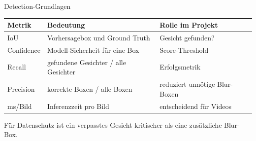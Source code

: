 \begin{frame}{Detection-Grundlagen}
\small
\begin{tabularx}{\textwidth}{l X X}
\toprule
Metrik & Bedeutung & Rolle im Projekt \\
\midrule
IoU & Vorhersagebox und Ground Truth & Gesicht gefunden? \\
Confidence & Modell-Sicherheit für eine Box & Score-Threshold \\
Recall & gefundene Gesichter / alle Gesichter & Erfolgsmetrik \\
Precision & korrekte Boxen / alle Boxen & reduziert unnötige Blur-Boxen \\
ms/Bild & Inferenzzeit pro Bild & entscheidend für Videos 
\end{tabularx}
\vspace{-1.0em}
\begin{mynote}[Bewertung]
Für Datenschutz ist ein verpasstes Gesicht kritischer als eine zusätzliche Blur-Box.
\end{mynote}
\end{frame}
